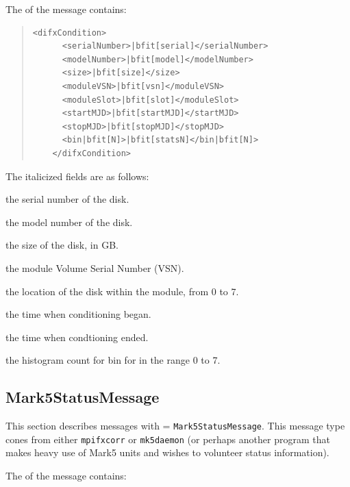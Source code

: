 \begin{description}
The  of the message contains:

\begin{quotation}
\begin{Verbatim}[commandchars=\|\[\]]
    <difxCondition>
      <serialNumber>|bfit[serial]</serialNumber>
      <modelNumber>|bfit[model]</modelNumber>
      <size>|bfit[size]</size>
      <moduleVSN>|bfit[vsn]</moduleVSN>
      <moduleSlot>|bfit[slot]</moduleSlot>
      <startMJD>|bfit[startMJD]</startMJD>
      <stopMJD>|bfit[stopMJD]</stopMJD>
      <bin|bfit[N]>|bfit[statsN]</bin|bfit[N]>
    </difxCondition>
\end{Verbatim}
\end{quotation}

\noindent The italicized fields are as follows:

\begin{description}
\item{} the serial number of the disk.
\item{} the model number of the disk.
\item{} the size of the disk, in GB.
\item{} the module Volume Serial Number (VSN).
\item{} the location of the disk within the module, from 0 to 7.
\item{} the time when conditioning began.
\item{} the time when condtioning ended.
\item{} the histogram count for bin  for  in the range 0 to 7.
\end{description}








\subsection{Mark5StatusMessage}

This section describes messages with  = {\tt Mark5StatusMessage}.
This message type cones from either {\tt mpifxcorr} or {\tt mk5daemon} (or perhaps another program that makes heavy use of Mark5 units and wishes to volunteer status information).

The  of the message contains:


\end{description}
